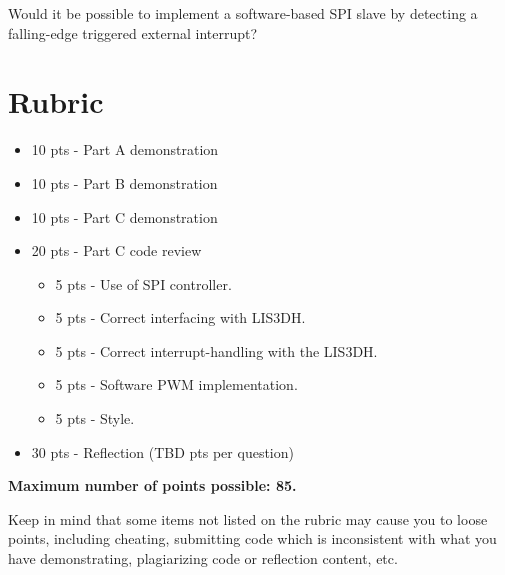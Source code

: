 \documentclass{article}
\begin{document}
Would it be possible to implement a software-based SPI slave by detecting a
falling-edge triggered external interrupt? 

\section{Rubric}

\begin{itemize}

	\item 10 pts - Part A demonstration

	\item 10 pts - Part B demonstration

	\item 10 pts - Part C demonstration

	\item 20 pts - Part C code review

	\begin{itemize}

		\item 5 pts - Use of SPI controller.

		\item 5 pts - Correct interfacing with LIS3DH.

    \item 5 pts - Correct interrupt-handling with the LIS3DH.

		\item 5 pts - Software PWM implementation.

		\item 5 pts - Style.

	\end{itemize}

	\item 30 pts - Reflection (TBD pts per question)

\end{itemize}

\textbf{Maximum number of points possible: 85.}

Keep in mind that some items not listed on the rubric may cause you to loose
points, including cheating, submitting code which is inconsistent with what you
have demonstrating, plagiarizing code or reflection content, etc.
\end{document}
